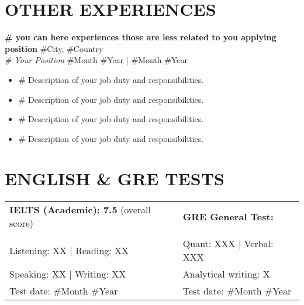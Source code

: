 \section*{OTHER EXPERIENCES}
\noindent
\textbf{\# you can here experiences those are less related to you applying position}  \hfill \#City, \#Country\\ %
\textit{\# Your Position} \hfill \#Month \#Year | \#Month \#Year %
\begin{itemize}
    \item \# Description of your job duty and responsibilities.
    \item \# Description of your job duty and responsibilities.
    \item \# Description of your job duty and responsibilities.
    \item \# Description of your job duty and responsibilities.
\end{itemize}

\section*{ENGLISH \& GRE TESTS}
    \begin{tabularx}{1\textwidth}{
    >{\raggedright\arraybackslash}X 
   >{\raggedright\arraybackslash}X }
      \textbf{IELTS (Academic): 7.5} (overall score)&   \textbf{GRE General Test:}\\ \\
    Listening: XX | Reading: XX & Quant: XXX | Verbal: XXX\\
    Speaking: XX   | Writing: XX& Analytical writing: X\\
    Test date: \#Month \#Year &Test date: \#Month \#Year
    \end{tabularx}


